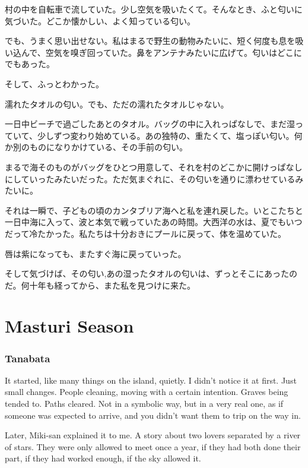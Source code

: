 \documentclass[
  letterpaper,
  oneside]{scrbook}
\begin{document}
村の中を自転車で流していた。少し空気を吸いたくて。そんなとき、ふと匂いに気づいた。どこか懐かしい、よく知っている匂い。

でも、うまく思い出せない。私はまるで野生の動物みたいに、短く何度も息を吸い込んで、空気を嗅ぎ回っていた。鼻をアンテナみたいに広げて。匂いはどこにでもあった。

そして、ふっとわかった。

濡れたタオルの匂い。でも、ただの濡れたタオルじゃない。

一日中ビーチで過ごしたあとのタオル。バッグの中に入れっぱなしで、まだ湿っていて、少しずつ変わり始めている。あの独特の、重たくて、塩っぽい匂い。何か別のものになりかけている、その手前の匂い。

まるで海そのものがバッグをひとつ用意して、それを村のどこかに開けっぱなしにしていったみたいだった。ただ気まぐれに、その匂いを通りに漂わせているみたいに。

それは一瞬で、子どもの頃のカンタブリア海へと私を連れ戻した。いとこたちと一日中海に入って、波と本気で戦っていたあの時間。大西洋の水は、夏でもいつだって冷たかった。私たちは十分おきにプールに戻って、体を温めていた。

唇は紫になっても、またすぐ海に戻っていった。

そして気づけば、その匂い,あの湿ったタオルの匂いは、ずっとそこにあったのだ。何十年も経ってから、また私を見つけに来た。


\chapter{Masturi Season}\label{masturi-season}

\subsection{Tanabata}\label{tanabata}

It started, like many things on the island, quietly. I didn't notice it
at first. Just small changes. People cleaning, moving with a certain
intention. Graves being tended to. Paths cleared. Not in a symbolic way,
but in a very real one, as if someone was expected to arrive, and you
didn't want them to trip on the way in.

Later, Miki-san explained it to me. A story about two lovers separated
by a river of stars. They were only allowed to meet once a year, if they
had both done their part, if they had worked enough, if the sky allowed
it.
\end{document}
